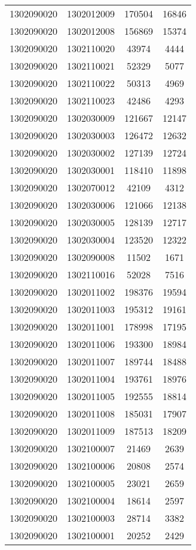 \begin{longtable}[h]{llcc}
		1302090020 & 1302012009 & 170504 & 16846\\
		1302090020 & 1302012008 & 156869 & 15374\\
		1302090020 & 1302110020 & 43974 & 4444\\
		1302090020 & 1302110021 & 52329 & 5077\\
		1302090020 & 1302110022 & 50313 & 4969\\
		1302090020 & 1302110023 & 42486 & 4293\\
		1302090020 & 1302030009 & 121667 & 12147\\
		1302090020 & 1302030003 & 126472 & 12632\\
		1302090020 & 1302030002 & 127139 & 12724\\
		1302090020 & 1302030001 & 118410 & 11898\\
		1302090020 & 1302070012 & 42109 & 4312\\
		1302090020 & 1302030006 & 121066 & 12138\\
		1302090020 & 1302030005 & 128139 & 12717\\
		1302090020 & 1302030004 & 123520 & 12322\\
		1302090020 & 1302090008 & 11502 & 1671\\
		1302090020 & 1302110016 & 52028 & 7516\\
		1302090020 & 1302011002 & 198376 & 19594\\
		1302090020 & 1302011003 & 195312 & 19161\\
		1302090020 & 1302011001 & 178998 & 17195\\
		1302090020 & 1302011006 & 193300 & 18984\\
		1302090020 & 1302011007 & 189744 & 18488\\
		1302090020 & 1302011004 & 193761 & 18976\\
		1302090020 & 1302011005 & 192555 & 18814\\
		1302090020 & 1302011008 & 185031 & 17907\\
		1302090020 & 1302011009 & 187513 & 18209\\
		1302090020 & 1302100007 & 21469 & 2639\\
		1302090020 & 1302100006 & 20808 & 2574\\
		1302090020 & 1302100005 & 23021 & 2659\\
		1302090020 & 1302100004 & 18614 & 2597\\
		1302090020 & 1302100003 & 28714 & 3382\\
		1302090020 & 1302100001 & 20252 & 2429\\

\end{longtable}
